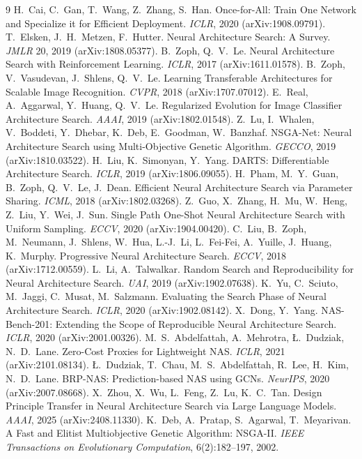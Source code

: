 \documentclass[11pt,a4paper]{article}
\begin{document}
\begin{thebibliography}{9}
 H.~Cai, C.~Gan, T.~Wang, Z.~Zhang, S.~Han. Once-for-All: Train One Network and Specialize it for Efficient Deployment. \emph{ICLR}, 2020 (arXiv:1908.09791).
 T.~Elsken, J.~H.~Metzen, F.~Hutter. Neural Architecture Search: A Survey. \emph{JMLR} 20, 2019 (arXiv:1808.05377).
 B.~Zoph, Q.~V.~Le. Neural Architecture Search with Reinforcement Learning. \emph{ICLR}, 2017 (arXiv:1611.01578).
 B.~Zoph, V.~Vasudevan, J.~Shlens, Q.~V.~Le. Learning Transferable Architectures for Scalable Image Recognition. \emph{CVPR}, 2018 (arXiv:1707.07012).
 E.~Real, A.~Aggarwal, Y.~Huang, Q.~V.~Le. Regularized Evolution for Image Classifier Architecture Search. \emph{AAAI}, 2019 (arXiv:1802.01548).
 Z.~Lu, I.~Whalen, V.~Boddeti, Y.~Dhebar, K.~Deb, E.~Goodman, W.~Banzhaf. NSGA-Net: Neural Architecture Search using Multi-Objective Genetic Algorithm. \emph{GECCO}, 2019 (arXiv:1810.03522).
 H.~Liu, K.~Simonyan, Y.~Yang. DARTS: Differentiable Architecture Search. \emph{ICLR}, 2019 (arXiv:1806.09055).
 H.~Pham, M.~Y.~Guan, B.~Zoph, Q.~V.~Le, J.~Dean. Efficient Neural Architecture Search via Parameter Sharing. \emph{ICML}, 2018 (arXiv:1802.03268).
 Z.~Guo, X.~Zhang, H.~Mu, W.~Heng, Z.~Liu, Y.~Wei, J.~Sun. Single Path One-Shot Neural Architecture Search with Uniform Sampling. \emph{ECCV}, 2020 (arXiv:1904.00420).
 C.~Liu, B.~Zoph, M.~Neumann, J.~Shlens, W.~Hua, L.-J.~Li, L.~Fei-Fei, A.~Yuille, J.~Huang, K.~Murphy. Progressive Neural Architecture Search. \emph{ECCV}, 2018 (arXiv:1712.00559).
 L.~Li, A.~Talwalkar. Random Search and Reproducibility for Neural Architecture Search. \emph{UAI}, 2019 (arXiv:1902.07638).
 K.~Yu, C.~Sciuto, M.~Jaggi, C.~Musat, M.~Salzmann. Evaluating the Search Phase of Neural Architecture Search. \emph{ICLR}, 2020 (arXiv:1902.08142).
 X.~Dong, Y.~Yang. NAS-Bench-201: Extending the Scope of Reproducible Neural Architecture Search. \emph{ICLR}, 2020 (arXiv:2001.00326).
 M.~S.~Abdelfattah, A.~Mehrotra, {\L}.~Dudziak, N.~D.~Lane. Zero-Cost Proxies for Lightweight NAS. \emph{ICLR}, 2021 (arXiv:2101.08134).
 {\L}.~Dudziak, T.~Chau, M.~S.~Abdelfattah, R.~Lee, H.~Kim, N.~D.~Lane. BRP-NAS: Prediction-based NAS using GCNs. \emph{NeurIPS}, 2020 (arXiv:2007.08668).
 X.~Zhou, X.~Wu, L.~Feng, Z.~Lu, K.~C.~Tan. Design Principle Transfer in Neural Architecture Search via Large Language Models. \emph{AAAI}, 2025 (arXiv:2408.11330).
 K.~Deb, A.~Pratap, S.~Agarwal, T.~Meyarivan. A Fast and Elitist Multiobjective Genetic Algorithm: NSGA-II. \emph{IEEE Transactions on Evolutionary Computation}, 6(2):182--197, 2002.

\end{thebibliography}
\end{document}
